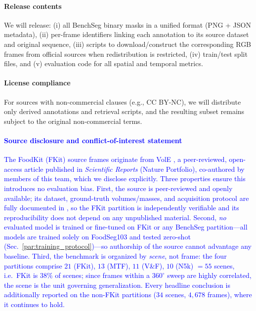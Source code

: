 \documentclass[preprint,12pt]{elsarticle}
\newcommand{\change}[1]{\textcolor{blue}{#1}}
\begin{document}
\paragraph{Release contents}
We will release: (i) all BenchSeg binary masks in a unified format (PNG + JSON metadata), (ii) per-frame identifiers linking each annotation to its source dataset and original sequence, (iii) scripts to download/construct the corresponding RGB frames from official sources when redistribution is restricted, (iv) train/test split files, and (v) evaluation code for all spatial and temporal metrics.

\paragraph{License compliance}
For sources with non-commercial clauses (e.g., CC BY-NC), we will distribute only derived annotations and retrieval scripts, and the resulting subset remains subject to the original non-commercial terms.

\change{\paragraph{Source disclosure and conflict-of-interest statement}
The FoodKit (FKit) source frames originate from VolE \cite{haroon2025vole}, a peer-reviewed, open-access article published in \emph{Scientific Reports} (Nature Portfolio), co-authored by members of this team, which we disclose explicitly. Three properties ensure this introduces no evaluation bias. First, the source is peer-reviewed and openly available; its dataset, ground-truth volumes/masses, and acquisition protocol are fully documented in \cite{haroon2025vole}, so the FKit partition is independently verifiable and its reproducibility does not depend on any unpublished material. Second, \emph{no} evaluated model is trained or fine-tuned on FKit or any BenchSeg partition---all models are trained solely on FoodSeg103 and tested zero-shot (Sec.~\ref{par:training_protocol})---so authorship of the source cannot advantage any baseline. Third, the benchmark is organized by \emph{scene}, not frame: the four partitions comprise $21$ (FKit),  $13$ (MTF), $11$ (V\&F), $10$ (N5k) $=55$ scenes, i.e.\ FKit is $38\%$ of scenes; since frames within a $360^\circ$ sweep are highly correlated, the scene is the unit governing generalization. Every headline conclusion is additionally reported on the non-FKit partitions ($34$ scenes, $4{,}678$ frames), where it continues to hold.}
\end{document}
